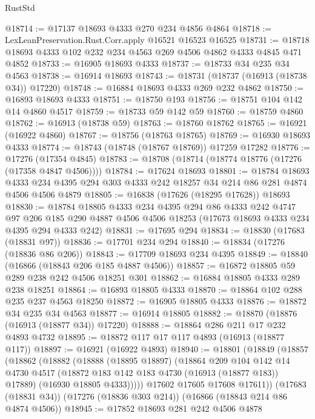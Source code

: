 \begin{lexlean}{RustStd}
\begin{coremodule}
@18714 := @17137 @18693 @4333 @270 @234 @4856 @4864
@18718 := LexLeanPreservation.Rust.Corr.apply @16521 @16523 @16525
@18731 := @18718 @18693 @4333 @102 @232 @234 @4563 @269 @4506 @4862 @4333 @4845 @471 @4852
@18733 := @16905 @18693 @4333
@18737 := @18733 @34 @235 @34 @4563
@18738 := @16914 @18693
@18743 := @18731 (@18737 (@16913 (@18738 @34)) @17220)
@18748 := @16884 @18693 @4333 @269 @232 @4862
@18750 := @16893 @18693 @4333
@18751 := @18750 @193
@18756 := @18751 @104 @142 @14 @4860 @4517
@18759 := @18733 @59 @142 @59
@18760 := @18759 @4860
@18762 := @16913 (@18738 @59)
@18763 := @18760 @18762
@18765 := @16921 (@16922 @4860)
@18767 := @18756 (@18763 @18765)
@18769 := @16930 @18693 @4333
@18774 := @18743 (@18748 (@18767 @18769)) @17259 @17282
@18776 := @17276 (@17354 @4845)
@18783 := @18708 (@18714 (@18774 @18776 (@17276 (@17358 @4847 @4506))))
@18784 := @17624 @18693
@18801 := @18784
    @18693
    @4333
    @234
    @4395
    @294
    @303
    @4333
    @242
    @18257
    @34
    @214
    @86
    @281
    @4874
    @4506
    @4506
    @4879
@18805 := @16838 (@17626 (@18295 @17628)) @18693
@18830 := @18784
    @18805
    @4333
    @234
    @4395
    @294
    @86
    @4333
    @242
    @4747
    @97
    @206
    @185
    @290
    @4887
    @4506
    @4506
    @18253
    (@17673 @18693 @4333 @234 @4395 @294 @4333 @242)
@18831 := @17695 @294
@18834 := @18830 (@17683 (@18831 @97))
@18836 := @17701 @234 @294
@18840 := @18834 (@17276 (@18836 @86 @206))
@18843 := @17709 @18693 @234 @4395
@18849 := @18840 (@16866 (@18843 @206 @185 @4887 @4506))
@18857 := @16872 @18805 @59 @289 @238 @242 @4506 @18251 @301
@18862 := @16884 @18805 @4333 @289 @238 @18251
@18864 := @16893 @18805 @4333
@18870 := @18864 @102 @288 @235 @237 @4563 @18250
@18872 := @16905 @18805 @4333
@18876 := @18872 @34 @235 @34 @4563
@18877 := @16914 @18805
@18882 := @18870 (@18876 (@16913 (@18877 @34)) @17220)
@18888 := @18864 @286 @211 @17 @232 @4893 @4732
@18895 := @18872 @117 @17 @117 @4893 (@16913 (@18877 @117))
@18897 := @16921 (@16922 @4893)
@18940 := @18801
    (@18849
      (@18857
        (@18862
          (@18882
            (@18888
              (@18895 @18897)
              (@18864
                @209
                @104
                @142
                @14
                @4730
                @4517
                (@18872 @183 @142 @183 @4730 (@16913 (@18877 @183)) @17889)
                (@16930 @18805 @4333)))))
        @17602
        @17605
        @17608
        @17611))
    (@17683 (@18831 @34))
    (@17276 (@18836 @303 @214))
    (@16866 (@18843 @214 @86 @4874 @4506))
@18945 := @17852 @18693 @281 @242 @4506 @4878

\end{coremodule}
\end{lexlean}
